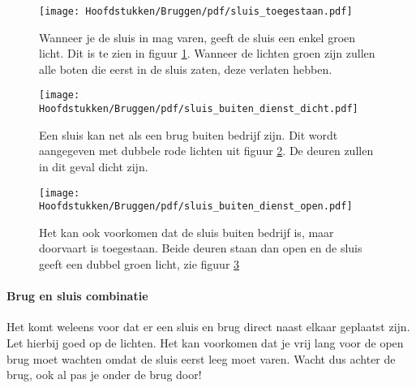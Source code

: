 \begin{figure}[H]
	\centering
	\begin{minipage}[b]{0.18\textwidth}	
		\texttt{[image: Hoofdstukken/Bruggen/pdf/sluis\_toegestaan.pdf]}
		\caption{}
		\label{pic:sluis:toegestaan}
	\end{minipage}
	\hfill
	\begin{minipage}[t]{0.75\textwidth}
		\vspace{-2cm}
		Wanneer je de sluis in mag varen, geeft de sluis een enkel groen licht. Dit is te zien in figuur \ref{pic:sluis:toegestaan}. Wanneer de lichten groen zijn zullen alle boten die eerst in de sluis zaten, deze verlaten hebben. 
	\end{minipage}
\end{figure}
\vspace{-0.35cm}
\begin{figure}[H]
	\centering
	\begin{minipage}[b]{0.18\textwidth}	
		\texttt{[image: Hoofdstukken/Bruggen/pdf/sluis\_buiten\_dienst\_dicht.pdf]}
		\caption{}
		\label{pic:sluis:buiten}
	\end{minipage}
	\hfill
	\begin{minipage}[t]{0.75\textwidth}
		\vspace{-2cm}
		Een sluis kan net als een brug buiten bedrijf zijn. Dit wordt aangegeven met dubbele rode lichten uit figuur \ref{pic:sluis:buiten}. De deuren zullen in dit geval dicht zijn.
	\end{minipage}
\end{figure}
\vspace{-0.35cm}
\begin{figure}[H]
	\centering
	\begin{minipage}[b]{0.18\textwidth}	
		\texttt{[image: Hoofdstukken/Bruggen/pdf/sluis\_buiten\_dienst\_open.pdf]}
		\caption{}
		\label{pic:sluis:buiten_toegestaan}
	\end{minipage}
	\hfill
	\begin{minipage}[t]{0.75\textwidth}
		\vspace{-2cm}
		Het kan ook voorkomen dat de sluis buiten bedrijf is, maar doorvaart is toegestaan. Beide deuren staan dan open en de sluis geeft een dubbel groen licht, zie figuur \ref{pic:sluis:buiten_toegestaan}
	\end{minipage}
\end{figure}

\paragraph{Brug en sluis combinatie}
Het komt weleens voor dat er een sluis en brug direct naast elkaar geplaatst zijn. Let hierbij goed op de lichten. Het kan voorkomen dat je vrij lang voor de open brug moet wachten omdat de sluis eerst leeg moet varen. Wacht dus achter de brug, ook al pas je onder de brug door!

